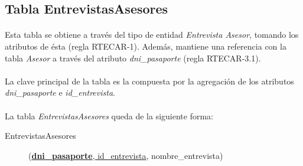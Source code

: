    \subsection{Tabla EntrevistasAsesores}

      \paragraph{}Esta tabla se obtiene a través del tipo de entidad
      \textit{Entrevista Asesor}, tomando los atributos de ésta (regla RTECAR-1).
      Además, mantiene una referencia con la tabla \textit{Asesor} a
      través del atributo \textit{dni\_pasaporte} (regla RTECAR-3.1).

      \paragraph{}La clave principal de la tabla es la compuesta por la
      agregación de los atributos \textit{dni\_pasaporte} e
      \textit{id\_entrevista}.

      \paragraph{}La tabla \textit{EntrevistasAsesores} queda de la siguiente forma:

      \begin{description}
         \item[EntrevistasAsesores] \begin{flushleft}(\underline{\textbf{dni\_pasaporte},
         id\_entrevista}, nombre\_entrevista)\end{flushleft}
      \end{description}

